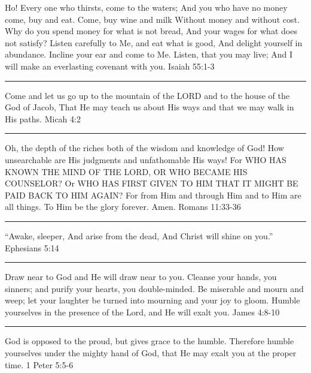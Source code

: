 \documentclass[]{book}
\begin{document}
Ho! Every one who thirsts, come to the waters; And you who have no money
come, buy and eat. Come, buy wine and milk Without money and without
cost. Why do you spend money for what is not bread, And your wages for
what does not satisfy? Listen carefully to Me, and eat what is good, And
delight yourself in abundance. Incline your ear and come to Me. Listen,
that you may live; And I will make an everlasting covenant with you.
\textbar{} Isaiah 55:1-3

\begin{center}\rule{0.5\linewidth}{\linethickness}\end{center}

Come and let us go up to the mountain of the LORD and to the house of
the God of Jacob, That He may teach us about His ways and that we may
walk in His paths. \textbar{} Micah 4:2

\begin{center}\rule{0.5\linewidth}{\linethickness}\end{center}

Oh, the depth of the riches both of the wisdom and knowledge of God! How
unsearchable are His judgments and unfathomable His ways! For WHO HAS
KNOWN THE MIND OF THE LORD, OR WHO BECAME HIS COUNSELOR? Or WHO HAS
FIRST GIVEN TO HIM THAT IT MIGHT BE PAID BACK TO HIM AGAIN? For from Him
and through Him and to Him are all things. To Him be the glory forever.
Amen. \textbar{} Romans 11:33-36

\begin{center}\rule{0.5\linewidth}{\linethickness}\end{center}

``Awake, sleeper, And arise from the dead, And Christ will shine on
you.'' \textbar{} Ephesians 5:14

\begin{center}\rule{0.5\linewidth}{\linethickness}\end{center}

Draw near to God and He will draw near to you. Cleanse your hands, you
sinners; and purify your hearts, you double-minded. Be miserable and
mourn and weep; let your laughter be turned into mourning and your joy
to gloom. Humble yourselves in the presence of the Lord, and He will
exalt you. \textbar{} James 4:8-10

\begin{center}\rule{0.5\linewidth}{\linethickness}\end{center}

God is opposed to the proud, but gives grace to the humble. Therefore
humble yourselves under the mighty hand of God, that He may exalt you at
the proper time. \textbar{} 1 Peter 5:5-6
\end{document}
